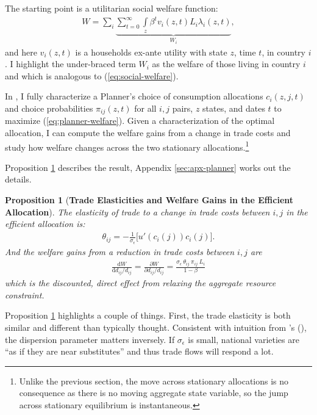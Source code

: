 \documentclass[12pt,pdftex]{article}
\newtheorem{prp}{Proposition}
\def\citeapos#1{\citeauthor{#1}'s (\citeyear{#1})}
\begin{document}
\begin{onehalfspacing}
The starting point is a utilitarian social welfare function:
\begin{align}
W = \sum_{i} \underbrace{\sum_{t=0}^{\infty} \int\limits_{z} \beta^{t}  v_{i}(z,t) L_{i}\lambda_{i}(z,t)}_{W_i},
\label{eq:planner-welfare}
\end{align}
and here $v_i(z,t)$ is a households ex-ante utility with state $z$, time $t$, in country $i$. I highlight the under-braced term $W_i$ as the welfare of those living in country $i$ and which is analogous to (\ref{eq:social-welfare}).

In \citet{waughoptimal}, I fully characterize a Planner's choice of consumption allocations $c_{i}(z, j, t)$ and choice probabilities $\pi_{ij}(z,t)$ for all $i,j$ pairs, $z$ states, and dates $t$ to maximize (\ref{eq:planner-welfare}). Given a characterization of the optimal allocation, I can compute the welfare gains from a change in trade costs and study how welfare changes across the two stationary allocations.\footnote{Unlike the previous section, the move across stationary allocations is no consequence as there is no moving aggregate state variable, so the jump across stationary equilibrium is instantaneous.}

Proposition \ref{prp:gains-efficient-allocation} describes the result, Appendix \ref{sec:apx-planner} works out the details.

\begin{prp}[\textbf{Trade Elasticities and Welfare Gains in the Efficient Allocation}]\label{prp:gains-efficient-allocation} The elasticity of trade to a change in trade costs between $i,j$ in the efficient allocation is:
\begin{align}
\theta_{ij} =  -\frac{1}{\sigma_{\epsilon}} \bigg [ u'(c_{i}(j)) c_{i}(j) \bigg]. \label{eq:eff-trade-elasticity}
\end{align}
And the welfare gains from a reduction in trade costs between $i,j$ are
\begin{align}
\frac{\mathrm{d} W}{\mathrm{d} d_{ij} / d_{ij}} = \frac{\partial W}{\partial d_{ij} / d_{ij}} = \frac{\sigma_{\epsilon} \  \theta_{ij} \  \pi_{ij} \ L_i}{1-\beta}
\label{eq:eff-trade-gains}
\end{align}
which is the discounted, direct effect from relaxing the aggregate resource constraint.
\end{prp}
Proposition \ref{prp:gains-efficient-allocation} highlights a couple of things. First, the trade elasticity is both similar and different than typically thought. Consistent with intuition from \citeapos{eaton2002technology}, the dispersion parameter matters inversely. If $\sigma_{\epsilon}$ is small, national varieties are ``as if they are near substitutes'' and thus trade flows will respond a lot.


\end{onehalfspacing}
\end{document}
